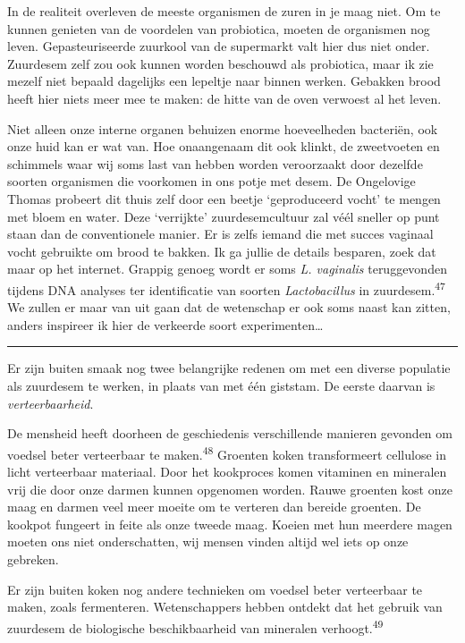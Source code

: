 \documentclass[
  11pt,
  dutch,
]{memoir}
\begin{document}
In de realiteit overleven de meeste organismen de zuren in je maag niet.
Om te kunnen genieten van de voordelen van probiotica, moeten de
organismen nog leven. Gepasteuriseerde zuurkool van de supermarkt valt
hier dus niet onder. Zuurdesem zelf zou ook kunnen worden beschouwd als
probiotica, maar ik zie mezelf niet bepaald dagelijks een lepeltje naar
binnen werken. Gebakken brood heeft hier niets meer mee te maken: de
hitte van de oven verwoest al het leven.

Niet alleen onze interne organen behuizen enorme hoeveelheden bacteriën,
ook onze huid kan er wat van. Hoe onaangenaam dit ook klinkt, de
zweetvoeten en schimmels waar wij soms last van hebben worden
veroorzaakt door dezelfde soorten organismen die voorkomen in ons potje
met desem. De Ongelovige Thomas probeert dit thuis zelf door een beetje
`geproduceerd vocht' te mengen met bloem en water. Deze `verrijkte'
zuurdesemcultuur zal véél sneller op punt staan dan de conventionele
manier. Er is zelfs iemand die met succes vaginaal vocht gebruikte om
brood te bakken. Ik ga jullie de details besparen, zoek dat maar op het
internet. Grappig genoeg wordt er soms \emph{L. vaginalis} teruggevonden
tijdens DNA analyses ter identificatie van soorten \emph{Lactobacillus}
in zuurdesem.\textsuperscript{47} We zullen er maar van uit gaan dat de
wetenschap er ook soms naast kan zitten, anders inspireer ik hier de
verkeerde soort experimenten\ldots{}

\pfbreak

Er zijn buiten smaak nog twee belangrijke redenen om met een diverse
populatie als zuurdesem te werken, in plaats van met één giststam. De
eerste daarvan is \emph{verteerbaarheid}.

De mensheid heeft doorheen de geschiedenis verschillende manieren
gevonden om voedsel beter verteerbaar te maken.\textsuperscript{48}
Groenten koken transformeert cellulose in licht verteerbaar materiaal.
Door het kookproces komen vitaminen en mineralen vrij die door onze
darmen kunnen opgenomen worden. Rauwe groenten kost onze maag en darmen
veel meer moeite om te verteren dan bereide groenten. De kookpot
fungeert in feite als onze tweede maag. Koeien met hun meerdere magen
moeten ons niet onderschatten, wij mensen vinden altijd wel iets op onze
gebreken.

Er zijn buiten koken nog andere technieken om voedsel beter verteerbaar
te maken, zoals fermenteren. Wetenschappers hebben ontdekt dat het
gebruik van zuurdesem de biologische beschikbaarheid van mineralen
verhoogt.\textsuperscript{49}
\end{document}
